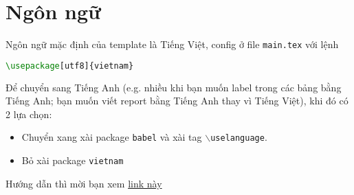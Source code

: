 \section{Ngôn ngữ}
Ngôn ngữ mặc định của template là Tiếng Việt, config ở file \texttt{main.tex} với lệnh
\begin{lstlisting}[language=tex]
\usepackage[utf8]{vietnam}
\end{lstlisting}
Để chuyển sang Tiếng Anh (e.g. nhiều khi bạn muốn label trong các bảng bằng Tiếng Anh; bạn muốn viết report bằng Tiếng Anh thay vì Tiếng Việt), khi đó có 2 lựa chọn:
\begin{itemize}
\item Chuyển xang xài package \texttt{babel} và xài tag \texttt{$\backslash$uselanguage}.
\item Bỏ xài package \texttt{vietnam}
\end{itemize}
Hướng dẫn thì mời bạn xem \href{https://www.overleaf.com/learn/latex/International_language_support#Babel}{link này}